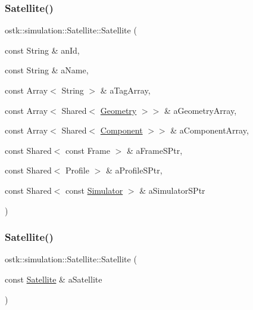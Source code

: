 \subsubsection{\texorpdfstring{Satellite()}{Satellite()}\hspace{0.1cm}{\footnotesize\ttfamily [1/2]}}
{\footnotesize\ttfamily ostk\+::simulation\+::\+Satellite\+::\+Satellite (\begin{DoxyParamCaption}\item[{const String \&}]{an\+Id,  }\item[{const String \&}]{a\+Name,  }\item[{const Array$<$ String $>$ \&}]{a\+Tag\+Array,  }\item[{const Array$<$ Shared$<$ \hyperlink{classostk_1_1simulation_1_1component_1_1_geometry}{Geometry} $>$$>$ \&}]{a\+Geometry\+Array,  }\item[{const Array$<$ Shared$<$ \hyperlink{classostk_1_1simulation_1_1_component}{Component} $>$$>$ \&}]{a\+Component\+Array,  }\item[{const Shared$<$ const Frame $>$ \&}]{a\+Frame\+S\+Ptr,  }\item[{const Shared$<$ Profile $>$ \&}]{a\+Profile\+S\+Ptr,  }\item[{const Shared$<$ const \hyperlink{classostk_1_1simulation_1_1_simulator}{Simulator} $>$ \&}]{a\+Simulator\+S\+Ptr }\end{DoxyParamCaption})}

\mbox{\label{classostk_1_1simulation_1_1_satellite_adb01c7d30bfc51144067e5a92709c638}} 
\subsubsection{\texorpdfstring{Satellite()}{Satellite()}\hspace{0.1cm}{\footnotesize\ttfamily [2/2]}}
{\footnotesize\ttfamily ostk\+::simulation\+::\+Satellite\+::\+Satellite (\begin{DoxyParamCaption}\item[{const \hyperlink{classostk_1_1simulation_1_1_satellite}{Satellite} \&}]{a\+Satellite }\end{DoxyParamCaption})}

\mbox{\label{classostk_1_1simulation_1_1_satellite_af6f1e69609eca81bda731d176a0f3786}} 
